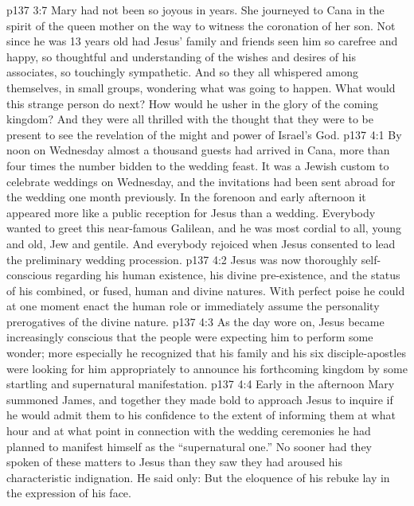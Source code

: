 \vs p137 3:7 Mary had not been so joyous in years. She journeyed to Cana in the spirit of the queen mother on the way to witness the coronation of her son. Not since he was 13 years old had Jesus’ family and friends seen him so carefree and happy, so thoughtful and understanding of the wishes and desires of his associates, so touchingly sympathetic. And so they all whispered among themselves, in small groups, wondering what was going to happen. What would this strange person do next? How would he usher in the glory of the coming kingdom? And they were all thrilled with the thought that they were to be present to see the revelation of the might and power of Israel’s God.
\vs p137 4:1 By noon on Wednesday almost a thousand guests had arrived in Cana, more than four times the number bidden to the wedding feast. It was a Jewish custom to celebrate weddings on Wednesday, and the invitations had been sent abroad for the wedding one month previously. In the forenoon and early afternoon it appeared more like a public reception for Jesus than a wedding. Everybody wanted to greet this near\hyp{}famous Galilean, and he was most cordial to all, young and old, Jew and gentile. And everybody rejoiced when Jesus consented to lead the preliminary wedding procession.
\vs p137 4:2 Jesus was now thoroughly self\hyp{}conscious regarding his human existence, his divine pre\hyp{}existence, and the status of his combined, or fused, human and divine natures. With perfect poise he could at one moment enact the human role or immediately assume the personality prerogatives of the divine nature.
\vs p137 4:3 As the day wore on, Jesus became increasingly conscious that the people were expecting him to perform some wonder; more especially he recognized that his family and his six disciple\hyp{}apostles were looking for him appropriately to announce his forthcoming kingdom by some startling and supernatural manifestation.
\vs p137 4:4 Early in the afternoon Mary summoned James, and together they made bold to approach Jesus to inquire if he would admit them to his confidence to the extent of informing them at what hour and at what point in connection with the wedding ceremonies he had planned to manifest himself as the “supernatural one.” No sooner had they spoken of these matters to Jesus than they saw they had aroused his characteristic indignation. He said only:  But the eloquence of his rebuke lay in the expression of his face.
